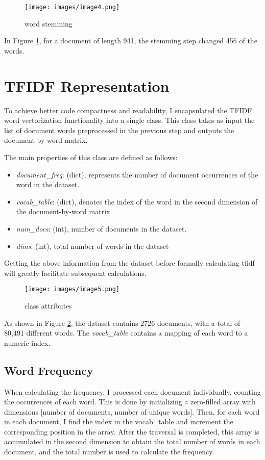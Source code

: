 \documentclass[12pt]{article}
\begin{document}
\begin{figure}[h]  %
    \centering     %
    \texttt{[image: images/image4.png]}  %
    \caption{word stemming}  %
    \label{fig:image1.4}  %
\end{figure}

In Figure \ref{fig:image1.4}, for a document of length 941, the stemming step changed 456 of the words.

\section{TFIDF Representation}
To achieve better code compactness and readability, I encapsulated the TFIDF word vectorization functionality into a single class. This class takes as input the list of document words preprocessed in the previous step and outputs the document-by-word matrix.

The main properties of this class are defined as follows:
\begin{itemize}
    \item \textit{document\_freq}: (dict), represents the number of document occurrences of the word in the dataset.
    \item \textit{vocab\_table}: (dict), denotes the index of the word in the second dimension of the document-by-word matrix.
    \item \textit{num\_docs}: (int), number of documents in the dataset.
    \item \textit{dims}: (int), total number of words in the dataset
\end{itemize}

Getting the above information from the dataset before formally calculating tfidf will greatly facilitate subsequent calculations.

\begin{figure}[h]  %
    \centering     %
    \texttt{[image: images/image5.png]}
    \caption{class attributes}  %
    \label{fig:image1.5}  %
\end{figure}

As shown in Figure \ref{fig:image1.5}, the dataset contains 2726 documents, with a total of 80,491 different words. The \textit{vocab\_table} contains a mapping of each word to a numeric index.
    
\subsection{Word Frequency}
When calculating the frequency, I processed each document individually, counting the occurrences of each word. 
This is done by initializing a zero-filled array with dimensions [number of documents, number of unique words]. 
Then, for each word in each document, I find the index in the vocab\_table and increment the corresponding position in the array. 
After the traversal is completed, this array is accumulated in the second dimension to obtain the total number of words in each document, and the total number is used to calculate the frequency.
\end{document}
